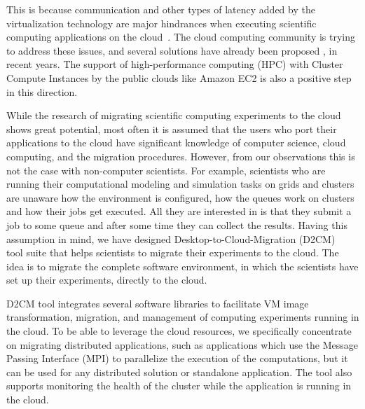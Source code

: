 \documentclass[a4paper,10pt]{article}
\begin{document}
This is because communication and other types of latency added by the virtualization technology are major hindrances when executing scientific computing applications on the cloud~\cite{srirama2011scalability, SPE:SPE995}. The cloud computing community is trying to address these issues, and several solutions have already been proposed \cite{SPE:SPE995, DBLP:conf/synasc/LiG10}, in recent years. The support of high-performance computing (HPC) with Cluster Compute Instances by the public clouds like Amazon EC2 is also a positive step in this direction.

While the research of migrating scientific computing experiments to the cloud shows great potential, most often it is assumed that the users who port their applications to the cloud have significant knowledge of computer science, cloud computing, and the migration procedures. However, from our observations this is not the case with non-computer scientists. For example, scientists who are running their computational modeling and simulation tasks on grids and clusters are unaware how the environment is configured, how the queues work on clusters and how their jobs get executed. All they are interested in is that they submit a job to some queue and after some time they can collect the results. Having this assumption in mind, we have designed Desktop-to-Cloud-Migration (D2CM)~\cite{Srirama:MCLab.D2CM, srirama2013direct} tool suite that helps scientists to migrate their experiments to the cloud. The idea is to migrate the complete software environment, in which the scientists have set up their experiments, directly to the cloud.

D2CM tool integrates several software libraries to facilitate VM image transformation, migration, and management of computing experiments running in the cloud. To be able to leverage the cloud resources, we specifically concentrate on migrating distributed applications, such as applications which use the Message Passing Interface (MPI) to parallelize the execution of the computations, but it can be used for any distributed solution or standalone application. The tool also supports monitoring the health of the cluster while the application is running in the cloud. 
\end{document}
